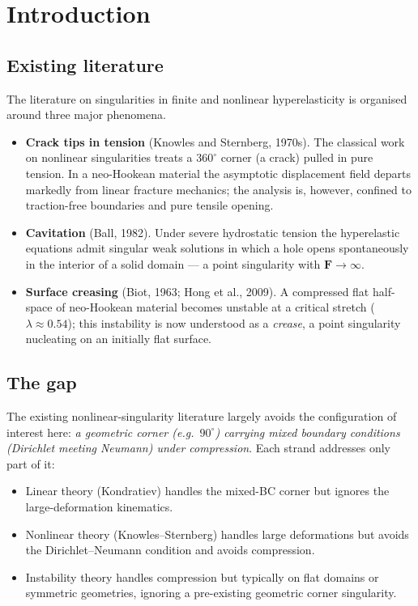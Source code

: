 \section{Introduction}
\label{sec:intro}


\subsection{Existing literature}
The literature on singularities in finite and nonlinear hyperelasticity is organised around three major phenomena.

\begin{itemize}
    \item \textbf{Crack tips in tension} (Knowles and Sternberg, 1970s). The classical work on nonlinear singularities
          treats a $360^\circ$ corner (a crack) pulled in pure tension. In a neo-Hookean material the asymptotic
          displacement field departs markedly from linear fracture mechanics; the analysis is, however, confined to
          traction-free boundaries and pure tensile opening.
    \item \textbf{Cavitation} (Ball, 1982). Under severe hydrostatic tension the hyperelastic equations admit singular
          weak solutions in which a hole opens spontaneously in the interior of a solid domain --- a point singularity
          with $\bm{F}\to\infty$.
    \item \textbf{Surface creasing} (Biot, 1963; Hong et al., 2009). A compressed flat half-space of neo-Hookean
          material becomes unstable at a critical stretch ($\lambda\approx0.54$); this instability is now understood as
          a \emph{crease}, a point singularity nucleating on an initially flat surface.
\end{itemize}

\subsection{The gap}
The existing nonlinear-singularity literature largely avoids the configuration of interest here: \emph{a geometric
corner (e.g.\ $90^\circ$) carrying mixed boundary conditions (Dirichlet meeting Neumann) under compression}. Each
strand addresses only part of it:

\begin{itemize}
    \item Linear theory (Kondratiev) handles the mixed-BC corner but ignores the large-deformation kinematics.
    \item Nonlinear theory (Knowles--Sternberg) handles large deformations but avoids the Dirichlet--Neumann condition
          and avoids compression.
    \item Instability theory handles compression but typically on flat domains or symmetric geometries, ignoring a
          pre-existing geometric corner singularity.
\end{itemize}

